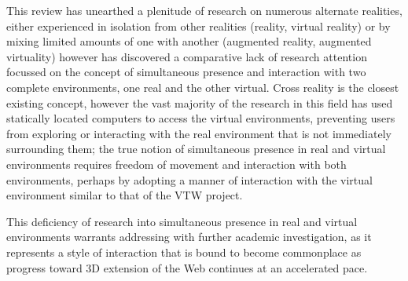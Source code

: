 This review has unearthed a plenitude of research on numerous alternate realities, either experienced in isolation from other realities (reality, virtual reality) or by mixing limited amounts of one with another (augmented reality, augmented virtuality) however has discovered a comparative lack of research attention focussed on the concept of simultaneous presence and interaction with two complete environments, one real and the other virtual. Cross reality is the closest existing concept, however the vast majority of the research in this field has used statically located computers to access the virtual environments, preventing users from exploring or interacting with the real environment that is not immediately surrounding them; the true notion of simultaneous presence in real and virtual environments requires freedom of movement and interaction with both environments, perhaps by adopting a manner of interaction with the virtual environment similar to that of the VTW project.

This deficiency of research into simultaneous presence in real and virtual environments warrants addressing with further academic investigation, as it represents a style of interaction that is bound to become commonplace as progress toward 3D extension of the Web continues at an accelerated pace.
